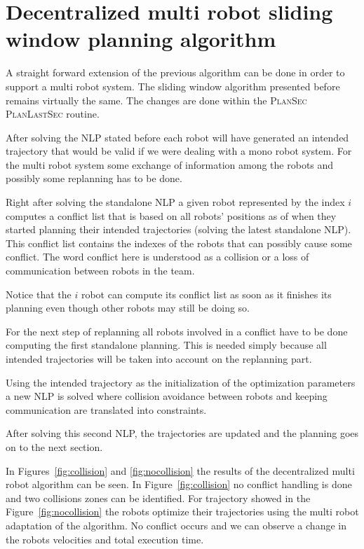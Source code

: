 \documentclass[eprint]{actapoly}
\begin{document}
\section{Decentralized multi robot sliding window planning algorithm}



A straight forward extension of the previous algorithm can be done in order to
support a multi robot system. The sliding window algorithm presented before 
remains
virtually the same. The changes are done within the {\scshape PlanSec} 
{\scshape PlanLastSec} routine.

After solving the NLP stated before each robot will have generated an intended 
trajectory that would be valid
if we were dealing with a mono robot system.
For the multi robot system some exchange of information among the robots and 
possibly some replanning has to be done.

Right after solving the standalone NLP a given robot represented by the index 
$i$ computes a conflict list that is based on 
all robots' positions as of when they started planning their intended 
trajectories (solving the latest standalone NLP).
This conflict list contains the indexes of
the robots  that can possibly cause some conflict. The word 
conflict here is understood as a collision or a loss of communication
between robots in the team.

Notice that the $i$ robot can compute its conflict list as soon as it finishes 
its planning even though other robots may still be doing so.

For the next step of replanning all robots involved in a conflict have to be 
done computing the first standalone planning. This is needed simply because
all intended trajectories will be taken into account on the replanning part.

Using the intended trajectory as the initialization of the optimization 
parameters a new NLP is solved where collision avoidance between robots
and keeping communication are translated into constraints.

After solving this second NLP, the trajectories are updated and the planning 
goes on to the next section.

In Figures~\ref{fig:collision} and \ref{fig:nocollision} the results of the 
decentralized multi robot algorithm can be seen.
In Figure~\ref{fig:collision} no conflict handling is done and two collisions 
zones can be identified.
For trajectory showed in the Figure~\ref{fig:nocollision} the robots optimize 
their trajectories using the multi robot
adaptation of the algorithm. No conflict occurs and we can observe a change in 
the robots velocities and total execution time.
\end{document}
